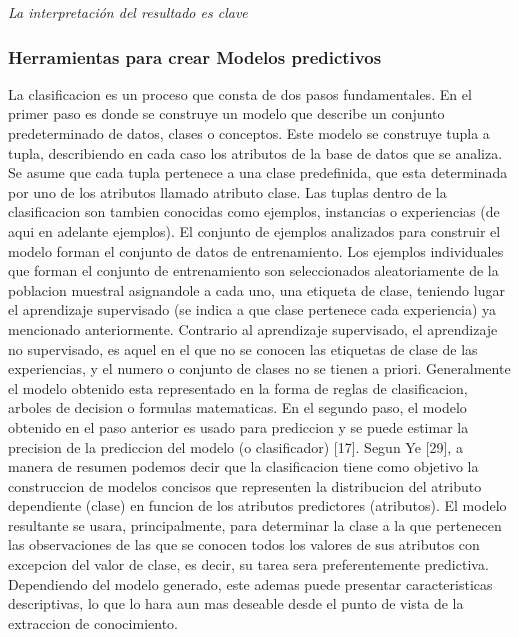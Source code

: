 \emph{La interpretación del resultado es clave}



\subsubsection{Herramientas para crear Modelos predictivos}



La clasificacion es un proceso que consta de dos pasos fundamentales. En el primer paso es donde se construye un modelo que describe un conjunto predeterminado de datos, clases o conceptos. Este modelo se construye tupla a tupla, describiendo en cada caso los atributos de la base de datos que se analiza. Se asume que cada tupla pertenece a una clase predefinida, que esta determinada por uno de los atributos llamado atributo clase. Las tuplas dentro de la clasificacion son tambien conocidas como ejemplos, instancias o experiencias (de aqui en adelante ejemplos). El conjunto de ejemplos analizados para construir el modelo forman el conjunto de datos de entrenamiento. Los ejemplos individuales que forman el conjunto de entrenamiento son seleccionados aleatoriamente de la poblacion muestral asignandole a cada uno, una etiqueta de clase, teniendo lugar el aprendizaje supervisado (se indica a que clase pertenece cada experiencia) ya mencionado anteriormente. Contrario al aprendizaje supervisado, el aprendizaje no supervisado, es aquel en el que no se conocen las etiquetas de clase de las experiencias, y el numero o conjunto de clases no se tienen a priori. Generalmente el modelo obtenido esta representado en la forma de reglas de clasificacion, arboles de decision o formulas matematicas. En el segundo paso, el modelo obtenido en el paso anterior es usado para prediccion y se puede estimar la precision de la prediccion del modelo (o clasificador) [17].
Segun Ye [29], a manera de resumen podemos decir que la clasificacion tiene como objetivo la construccion de modelos concisos que representen la distribucion
del atributo dependiente (clase) en funcion de los atributos predictores (atributos). El modelo resultante se usara, principalmente, para determinar la clase a la que pertenecen las observaciones de las que se conocen todos los valores de sus atributos con excepcion del valor de clase, es decir, su tarea sera preferentemente predictiva. Dependiendo del modelo generado, este ademas puede presentar caracteristicas descriptivas, lo que lo hara aun mas deseable desde el punto de vista de la extraccion de conocimiento.

